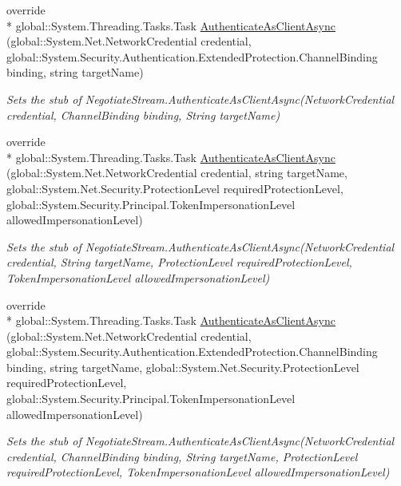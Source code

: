 \begin{DoxyCompactItemize}
override \\*
global\-::\-System.\-Threading.\-Tasks.\-Task \hyperlink{class_system_1_1_net_1_1_security_1_1_fakes_1_1_stub_negotiate_stream_ae26246e7763a70e66cbaccf28e48d94f}{Authenticate\-As\-Client\-Async} (global\-::\-System.\-Net.\-Network\-Credential credential, global\-::\-System.\-Security.\-Authentication.\-Extended\-Protection.\-Channel\-Binding binding, string target\-Name)
\begin{DoxyCompactList}\small\item\em Sets the stub of Negotiate\-Stream.\-Authenticate\-As\-Client\-Async(\-Network\-Credential credential, Channel\-Binding binding, String target\-Name)\end{DoxyCompactList}\item 
override \\*
global\-::\-System.\-Threading.\-Tasks.\-Task \hyperlink{class_system_1_1_net_1_1_security_1_1_fakes_1_1_stub_negotiate_stream_affce7238f34668205b3b499817c914a7}{Authenticate\-As\-Client\-Async} (global\-::\-System.\-Net.\-Network\-Credential credential, string target\-Name, global\-::\-System.\-Net.\-Security.\-Protection\-Level required\-Protection\-Level, global\-::\-System.\-Security.\-Principal.\-Token\-Impersonation\-Level allowed\-Impersonation\-Level)
\begin{DoxyCompactList}\small\item\em Sets the stub of Negotiate\-Stream.\-Authenticate\-As\-Client\-Async(\-Network\-Credential credential, String target\-Name, Protection\-Level required\-Protection\-Level, Token\-Impersonation\-Level allowed\-Impersonation\-Level)\end{DoxyCompactList}\item 
override \\*
global\-::\-System.\-Threading.\-Tasks.\-Task \hyperlink{class_system_1_1_net_1_1_security_1_1_fakes_1_1_stub_negotiate_stream_a5fc03a7065824067c7026f7a1a4110bd}{Authenticate\-As\-Client\-Async} (global\-::\-System.\-Net.\-Network\-Credential credential, global\-::\-System.\-Security.\-Authentication.\-Extended\-Protection.\-Channel\-Binding binding, string target\-Name, global\-::\-System.\-Net.\-Security.\-Protection\-Level required\-Protection\-Level, global\-::\-System.\-Security.\-Principal.\-Token\-Impersonation\-Level allowed\-Impersonation\-Level)
\begin{DoxyCompactList}\small\item\em Sets the stub of Negotiate\-Stream.\-Authenticate\-As\-Client\-Async(\-Network\-Credential credential, Channel\-Binding binding, String target\-Name, Protection\-Level required\-Protection\-Level, Token\-Impersonation\-Level allowed\-Impersonation\-Level)\end{DoxyCompactList}\item 

\end{DoxyCompactItemize}
